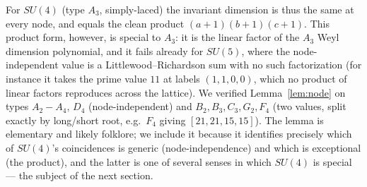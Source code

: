 \documentclass[11pt,a4paper]{article}
\begin{document}
For $SU(4)$ (type $A_3$, simply-laced) the invariant dimension is thus the same at every
node, and equals the clean product $(a+1)(b+1)(c+1)$. This product form, however, is
special to $A_3$: it is the linear factor of the $A_3$ Weyl dimension polynomial, and it
fails already for $SU(5)$, where the node-independent value is a Littlewood--Richardson sum
with no such factorization (for instance it takes the prime value $11$ at labels
$(1,1,0,0)$, which no product of linear factors reproduces across the lattice). We verified
Lemma~\ref{lem:node} on types $A_2\!-\!A_4,\,D_4$ (node-independent) and
$B_2,B_3,C_3,G_2,F_4$ (two values, split exactly by long/short root, e.g.\ $F_4$ giving
$[21,21,15,15]$). The lemma is elementary and likely folklore; we include it because it
identifies precisely which of $SU(4)$'s coincidences is generic (node-independence) and
which is exceptional (the product), and the latter is one of several senses in which
$SU(4)$ is special --- the subject of the next section.

\end{document}
